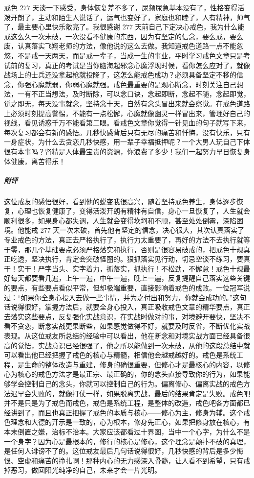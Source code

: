 \begin{case}
    戒色 277 天谈一下感受，身体恢复差不多了，尿频尿急基本没有了，性格变得活泼开朗了，主动和陌生人说话了，运气也变好了，家庭也和睦了，人有精神，帅气了，最主要心里快乐敞亮了。我很感谢 277 天前自己下定决心戒色，我为什么能戒这么久一次未破，一次没看不健康的东西，因为有坚定的信念，要么戒，要么废，认真落实飞翔老师的方法，像他说的这么去做。我知道戒色道路一点不能忽悠，不是戒一天两天，而是戒一辈子，当成一生的事业，平时学习戒色文章只是考试前的复习，真正的考试是当你脑海起邪念心魔浮现时候，看你怎么应对了，就像战场上的士兵还没拿起枪就投降了，这怎么能戒色成功？必须具备坚定不移的信念，你强心魔就弱，你弱心魔就强。戒色最重要的是观心断念，时刻关注自己想法，一有不正当想法，及时断除，可以念口诀，念起即断，念起不随，念起即觉，觉之即无，每天没事就念，坚持念十天，自然有念头冒出来就会察觉。在戒色道路上必须时刻提高警惕，不能有一点松懈，心魔就像幽灵一样冒出来，管理好自己的视线，看见诱惑千万不能看第二眼。看戒色文章你觉得一针见血的句子就写下来，每次复习都会有新的感悟。几秒快感背后只有无尽的痛苦和忏悔，没有快乐，只有一身症状，为什么去贪恋几秒快感，用一辈子幸福抵押呢？一个大男人玩自己下体很有本事吗？肾精是人体最宝贵的资源，你浪费了多少！我们一起努力早日恢复身体健康，离苦得乐！
    \subparagraph{附评} 这位戒友的感悟很好，看到他的蜕变我很高兴，随着坚持戒色养生，身体逐步恢复，心理也恢复健康了，变得活泼开朗有精神有自信，身心一旦恢复了，人生就会顺利很多，如果身心都失调，人生就会变得坎坷和不顺，甚至处处倒霉，深陷困境。他能戒 277 天一次未破，首先他有坚定的信念，决心很大，其次认真落实了专业戒色的方法，真正去严格执行了，执行力太重要了，再好的方法不去执行就等于零，那几个基础要点必须严格落实和执行，否则是很容易破戒的，把戒色十规真正吃透，坚决执行，肯定会突破怪圈的。狠抓落实见行动，切忌空谈不练习，要真干！实干！严字当头、实字着力，抓落实，抓执行！不松劲，不懈怠！戒色十规最好每天都要看几遍，上午一遍，中午一遍，晚上一遍，反复提醒自己落实这些关键的要点，有些要点看似平常，但却极端重要，直接影响着戒色的成败。一位冠军说过：“如果你全身心投入去做一些事情，并为之付出和努力，你就会成功的。”这句话说得很好，掌握方法后，就要全身心投入，真正吸收戒色文章的精华要点，真正去落实这些要点，反复强化实战意识，在实战时做对的事，对境避开要快，坚决不看不贪恋，断念实战更果断些，如果感觉做得不好，就要及时反省，不断优化实战表现。从这位戒友所总结的经验中可以看出，他在断念和对境实战方面已经具备很高的觉悟，实战意识已经很强了，他之所以能做到一次未破，从他的这段总结中就可以看出他已经把握了戒色的核心与精髓，相信他会越戒越好的。戒色是系统工程，是生命的整体改造与重建，修身的确很重要，但修心才是最核心的内容，以修心为核心的戒色方法才是最正宗、最正确的，你的念头直接导致你的行为，如果能够学会控制自己的念头，你就可以控制自己的行为。偏离修心、偏离实战的戒色方法迟早会失败的，就像打仗一样，如果脱离实战，最后的结果肯定是失败。戒色吧并不是只是为了戒色而戒色，戒色是系统工程，是整体的改造，戒色吧各方面都已经讲到了，而且也真正把握了戒色的本质与核心——修心为主，修身为辅。这个戒色理念和大德的开示是一致的，心为根本，修身先正心，如果把修身放在核心，有本末倒置之嫌，治标不治本。大家应该都看过十界图，当中一个心字，为什么不是一个身字？因为心是最根本的，修行的核心是修心，这个理念是颠扑不破的真理，是任何人诽谤不了的。这位戒友最后几句话说得很好，几秒快感的背后是多少悔恨、空虚和痛苦的挣扎啊！那种内心的无力感深入骨髓，让人看不到希望，只有戒掉恶习，做回阳光纯净的自己，未来才会一片光明。


\end{case}
